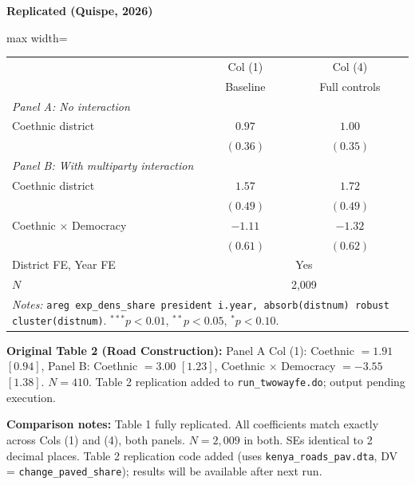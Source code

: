 \documentclass[11pt,a4paper]{article}
\begin{document}
\begin{minipage}[t]{0.48\textwidth}
\centering
\textbf{\large Replicated (Quispe, 2026)}
\vspace{0.3cm}

\begin{adjustbox}{max width=\textwidth}
\begin{tabular}{lcc}
\toprule
 & Col (1) & Col (4) \\
 & Baseline & Full controls \\
\midrule
\multicolumn{3}{l}{\textit{Panel A: No interaction}} \\[3pt]
Coethnic district & $0.97$ & $1.00$ \\
 & $(0.36)$ & $(0.35)$ \\[0.3em]
\multicolumn{3}{l}{\textit{Panel B: With multiparty interaction}} \\[3pt]
Coethnic district & $1.57$ & $1.72$ \\
 & $(0.49)$ & $(0.49)$ \\
Coethnic $\times$ Democracy & $-1.11$ & $-1.32$ \\
 & $(0.61)$ & $(0.62)$ \\[0.3em]
\midrule
District FE, Year FE & \multicolumn{2}{c}{Yes} \\
$N$ & \multicolumn{2}{c}{2,009} \\
\bottomrule
\multicolumn{3}{p{0.95\textwidth}}{\footnotesize\textit{Notes:} \texttt{areg exp\_dens\_share president i.year, absorb(distnum) robust cluster(distnum)}. $^{***}p<0.01$, $^{**}p<0.05$, $^{*}p<0.10$.}
\end{tabular}
\end{adjustbox}
\end{minipage}

\vspace{0.5cm}

\textbf{Original Table 2 (Road Construction):} Panel A Col (1): Coethnic $= 1.91$ $[0.94]$, Panel B: Coethnic $= 3.00$ $[1.23]$, Coethnic $\times$ Democracy $= -3.55$ $[1.38]$. $N = 410$. Table 2 replication added to \texttt{run\_twowayfe.do}; output pending execution.

\vspace{0.5cm}
\textbf{Comparison notes:} Table 1 fully replicated. All coefficients match exactly across Cols (1) and (4), both panels. $N = 2{,}009$ in both. SEs identical to 2 decimal places. Table 2 replication code added (uses \texttt{kenya\_roads\_pav.dta}, DV = \texttt{change\_paved\_share}); results will be available after next run.
\end{document}
